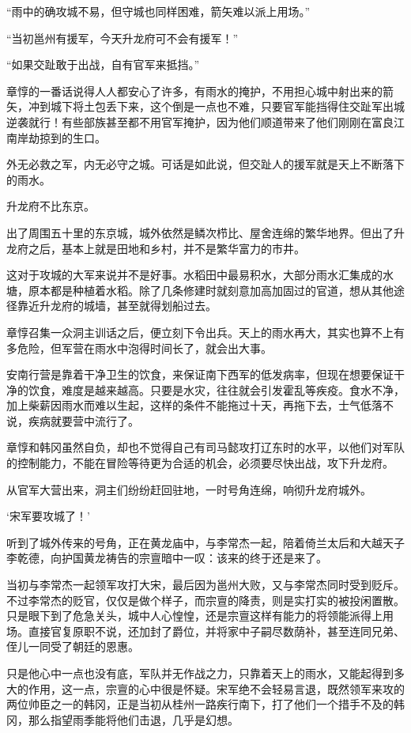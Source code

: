 “雨中的确攻城不易，但守城也同样困难，箭矢难以派上用场。”

“当初邕州有援军，今天升龙府可不会有援军！”

“如果交趾敢于出战，自有官军来抵挡。”

章惇的一番话说得人人都安心了许多，有雨水的掩护，不用担心城中射出来的箭矢，冲到城下将土包丢下来，这个倒是一点也不难，只要官军能挡得住交趾军出城逆袭就行！有些部族甚至都不用官军掩护，因为他们顺道带来了他们刚刚在富良江南岸劫掠到的生口。

外无必救之军，内无必守之城。可话是如此说，但交趾人的援军就是天上不断落下的雨水。

升龙府不比东京。

出了周围五十里的东京城，城外依然是鳞次栉比、屋舍连绵的繁华地界。但出了升龙府之后，基本上就是田地和乡村，并不是繁华富力的市井。

这对于攻城的大军来说并不是好事。水稻田中最易积水，大部分雨水汇集成的水塘，原本都是种植着水稻。除了几条修建时就刻意加高加固过的官道，想从其他途径靠近升龙府的城墙，甚至就得划船过去。

章惇召集一众洞主训话之后，便立刻下令出兵。天上的雨水再大，其实也算不上有多危险，但军营在雨水中泡得时间长了，就会出大事。

安南行营是靠着干净卫生的饮食，来保证南下西军的低发病率，但现在想要保证干净的饮食，难度是越来越高。只要是水灾，往往就会引发霍乱等疾疫。食水不净，加上柴薪因雨水而难以生起，这样的条件不能拖过十天，再拖下去，士气低落不说，疾病就要营中流行了。

章惇和韩冈虽然自负，却也不觉得自己有司马懿攻打辽东时的水平，以他们对军队的控制能力，不能在冒险等待更为合适的机会，必须要尽快出战，攻下升龙府。

从官军大营出来，洞主们纷纷赶回驻地，一时号角连绵，响彻升龙府城外。

‘宋军要攻城了！’

听到了城外传来的号角，正在黄龙庙中，与李常杰一起，陪着倚兰太后和大越天子李乾德，向护国黄龙祷告的宗亶暗中一叹：该来的终于还是来了。

当初与李常杰一起领军攻打大宋，最后因为邕州大败，又与李常杰同时受到贬斥。不过李常杰的贬官，仅仅是做个样子，而宗亶的降责，则是实打实的被投闲置散。只是眼下到了危急关头，城中人心惶惶，还是宗亶这样有能力的将领能派得上用场。直接官复原职不说，还加封了爵位，并将家中子嗣尽数荫补，甚至连同兄弟、侄儿一同受了朝廷的恩惠。

只是他心中一点也没有底，军队并无作战之力，只靠着天上的雨水，又能起得到多大的作用，这一点，宗亶的心中很是怀疑。宋军绝不会轻易言退，既然领军来攻的两位帅臣之一的韩冈，正是当初从桂州一路疾行南下，打了他们一个措手不及的韩冈，那么指望雨季能将他们击退，几乎是幻想。

